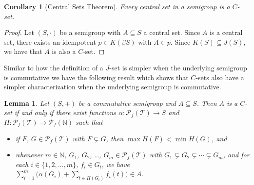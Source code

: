 \documentclass[12pt,showtrims]{memoir}
\theoremstyle{plain}
\newtheorem{lem}[thm]{Lemma}
\newtheorem{cor}[thm]{Corollary}
\theoremstyle{definition}
\newcommand{\bbN}{\mathbb{N}}
\newcommand{\calT}{\mathcal{T}}
\newcommand{\Pf}{\mathcal{P}_f}
\begin{document}
\begin{cor}[Central Sets Theorem]
  Every central set in a semigroup is a $C$-set.
\end{cor}
\begin{proof}
  Let $(S, \cdot)$ be a semigroup with $A \subseteq S$ a central set. 
  Since $A$ is a central set, there exists an idempotent $p \in K(\beta S)$ with $A \in p$.
  Since $K(S) \subseteq J(S)$, we have that $A$ is also a $C$-set.
\end{proof}

Similar to how the definition of a $J$-set is simpler when the underlying semigroup is commutative we have the following result which shows that $C$-sets also have a simpler characterization when the underlying semigroup is commutative. 

\begin{lem}
  Let $(S, +)$ be a commutative semigroup and $A \subseteq S$.
  Then $A$ is a $C$-set if and only if there exist functions $\alpha \colon \Pf(\calT) \to S$ and $H \colon \Pf(\calT) \to \Pf(\bbN)$ such that
  \begin{itemize}
    \item[(1)] if $F$, $G \in \Pf(\calT)$ with $F \subsetneq G$, then $\max H(F) < \min H(G)$, and
    
    \item[(2)] whenever $m \in \bbN$, $G_1$, $G_2$, \dots, $G_m \in \Pf(\calT)$ with $G_1 \subsetneq G_2 \subsetneq \cdots \subsetneq G_m$, and for each $i \in \{1, 2, \ldots, m\}$, $f_i \in G_i$, we have $\sum_{i=1}^m\bigl( \alpha(G_i) + \sum_{t \in H(G_i)} f_i(t)\bigr) \in A$.
  \end{itemize}
\end{lem}
\end{document}
